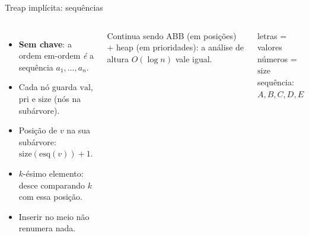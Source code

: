 \documentclass[aspectratio=169,11pt]{beamer}
\theoremstyle{definition}
\begin{document}
\begin{frame}{Treap implícita: sequências}
  \begin{columns}[T]
  \begin{itemize}
  \item \textbf{Sem chave}: a ordem em-ordem \emph{é} a sequência
    $a_1,\dots,a_n$.
  \item Cada nó guarda $\mathrm{val}$, $\mathrm{pri}$ e
    $\mathrm{size}$ (nós na subárvore).
  \item Posição de $v$ na sua subárvore:
    $\mathrm{size}(\mathrm{esq}(v))+1$.
  \item $k$-ésimo elemento: desce comparando $k$ com essa posição.
  \item Inserir no meio não renumera nada.
  \end{itemize}
  \pause
  \medskip
  Continua sendo ABB (em posições) + heap (em prioridades): a análise
  de altura $O(\log n)$ vale igual.
  \centering
 
  \small letras = valores \quad números = $\mathrm{size}$\\
  sequência: $A,B,C,D,E$
  \end{columns}
\end{frame}
 
\end{document}
